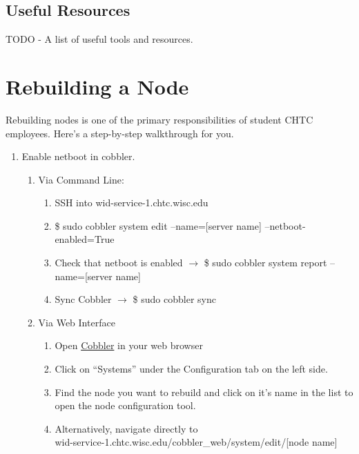 \documentclass[10pt,letterpaper]{article}
\begin{document}
    \subsection{Useful Resources}
        TODO - A list of useful tools and resources.

\clearpage

\section{Rebuilding a Node}
    Rebuilding nodes is one of the primary responsibilities of student CHTC employees.
    Here’s a step-by-step walkthrough for you.

    \begin{enumerate}
        \item Enable netboot in cobbler.
        \begin{enumerate}
            \item Via Command Line:
            \begin{enumerate}
                \item SSH into wid-service-1.chtc.wisc.edu
                \item {\selectfont \$ sudo cobbler system edit
                --name=[server name] --netboot-enabled=True }
                \item Check that netboot is enabled $\rightarrow$
                {\selectfont \$ sudo cobbler system report
                --name=[server name] }
                \item Sync Cobbler $\rightarrow$ {\selectfont
                \$ sudo cobbler sync }
            \end{enumerate}
            \item Via Web Interface
            \begin{enumerate}
                \item Open \href{https://wid-service-1.chtc.wisc.edu/cobbler_web}{Cobbler}
                in your web browser
                \item Click on “Systems” under the Configuration tab on the left side.
                \item Find the node you want to rebuild and click on it’s name in
                the list to open the node configuration tool.
                \item Alternatively, navigate directly to \\
                wid-service-1.chtc.wisc.edu/cobbler\_web/system/edit/[node name]

\end{enumerate}
\end{enumerate}
\end{enumerate}
\end{document}
